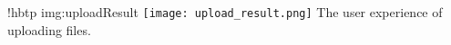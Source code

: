 \namedfigure
{!hbtp}
{img:uploadResult}
{\texttt{[image: upload\_result.png]}}
{The user experience of uploading files.}
